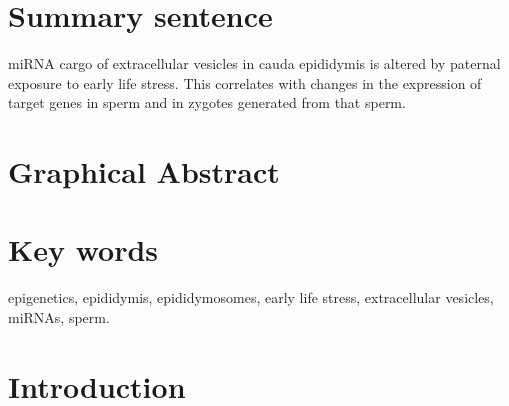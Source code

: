 \documentclass[12pt,twoside]{reedthesis}
\begin{document}
\hypertarget{summary-sentence}{%
\section{Summary sentence}\label{summary-sentence}}

miRNA cargo of extracellular vesicles in cauda epididymis is altered by
paternal exposure to early life stress. This correlates with changes in
the expression of target genes in sperm and in zygotes generated from
that sperm.

\newpage

\hypertarget{graphical-abstract-1}{%
\section{Graphical Abstract}\label{graphical-abstract-1}}

\hypertarget{key-words}{%
\section{Key words}\label{key-words}}

epigenetics, epididymis, epididymosomes, early life stress,
extracellular vesicles, miRNAs, sperm.

\newpage

\hypertarget{introduction-1}{%
\section{Introduction}\label{introduction-1}}
\end{document}
